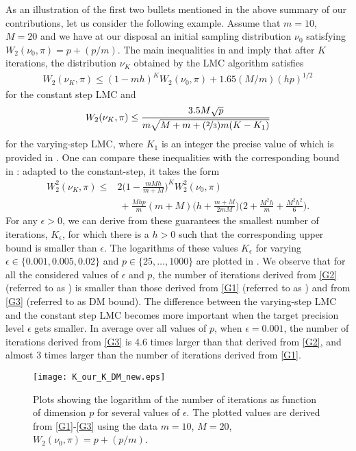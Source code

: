 \documentclass[aoap,preprint,reqno,a4paper]{imsart} %
\newcommand{\eps}{\epsilon}
\begin{document}
As an illustration of the first two bullets mentioned in the above summary of our contributions,
let us consider the following example. Assume that $m=10$, $M=20$
and we have at our disposal an initial sampling distribution $\nu_0$ satisfying
$W_2(\nu_0,\pi) = p + (p/m)$. The main inequalities in   and
 imply that after $K$ iterations, the distribution $\nu_K$
obtained by the LMC algorithm satisfies
\begin{align}\label{G1}
W_2(\nu_K, \pi) \le  (1-mh)^K W_2(\nu_0,\pi) + 1.65(M/m)(hp)^{1/2}
\end{align}
for the constant step LMC and
\begin{align}\label{G2}
W_2(\nu_K,\pi)\le \frac{3.5M\sqrt{p}}{m\sqrt{M+m+(\nicefrac23)m(K-K_1)}}
\end{align}
for the varying-step LMC, where $K_1$ is an integer the precise value of which
is provided in . One can compare these inequalities with the corresponding
bound in \citep{Durmus2}: adapted to the constant-step, it takes the form
\begin{align}
W_2^2(\nu_{K}, \pi) \le &
2\Big(1-\frac{mMh}{m+M}\Big)^K W^2_2(\nu_0,\pi)\\
&\ +
\frac{Mhp}{m}(m+M)\Big(h + \frac{m+M}{2mM}\Big)\Big(2+\frac{M^2h}{m}+\frac{M^2h^2}{6}\Big).
\label{G3}
\end{align}
For any $\eps>0$, we can derive from these guarantees the smallest number of iterations,
$K_\eps$, for which there is a $h>0$ such that the corresponding upper bound is smaller
than $\eps$. The logarithms of these values $K_\eps$ for varying $\eps\in\{0.001,0.005,0.02\}$
and $p\in\{25,\ldots,1000\}$ are plotted in . We observe that for all the considered values
of $\eps$ and $p$, the number of iterations derived from \eqref{G2} (referred to as )
is smaller than those derived from \eqref{G1} (referred to as ) and from
\eqref{G3} (referred to as DM bound). The difference between the varying-step LMC and the constant
step LMC becomes more important when the target precision level $\eps$ gets smaller.
In average over all values of $p$, when $\eps = 0.001$, the number of iterations derived from
\eqref{G3} is 4.6 times larger than that derived from \eqref{G2}, and almost $3$ times larger
than the number of iterations derived from \eqref{G1}.

\begin{figure}
\texttt{[image: K\_our\_K\_DM\_new.eps]}
\caption{Plots showing the logarithm of the number of iterations as function of dimension $p$ for
several values of $\eps$. The plotted values are derived from \eqref{G1}-\eqref{G3} using the data $m=10$,
$M=20$, $W_2(\nu_0,\pi)=p + (p/m)$.}
\label{fig1}
\end{figure}
\end{document}
